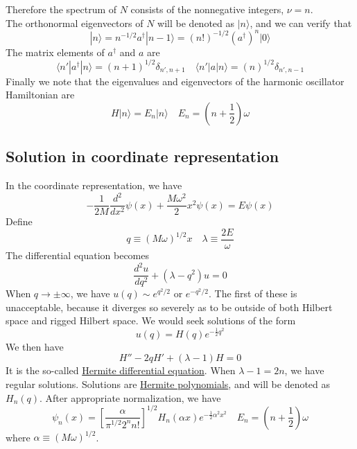 Therefore the spectrum of $N$ consists of the nonnegative integers, $\nu=n$. \\
The orthonormal eigenvectors of $N$ will be denoted as $|n\rangle$, and we can verify that
\[ |n\rangle = n^{-1/2} a^{\dagger} |n-1\rangle = (n!)^{-1/2} (a^{\dagger})^n |0\rangle\]
The matrix elements of $a^{\dagger}$ and $a$ are
\[\langle n' | a^{\dagger} |n \rangle = (n+1)^{1/2}\delta_{n',n+1} \quad  \langle n' | a |n \rangle = (n)^{1/2}\delta_{n',n-1}\]
Finally we note that the eigenvalues and eigenvectors of the harmonic oscillator Hamiltonian are
\[H |n\rangle = E_n |n\rangle \quad  E_n =(n+\frac{1}{2})\omega\]

\subsection{Solution in coordinate representation}
In the coordinate representation, we have
\[-\frac{1}{2M} \frac{d^2}{dx^2} \psi(x) + \frac{M\omega^2}{2}x^2 \psi(x) = E \psi(x)\]
Define
\[q \equiv (M\omega)^{1/2}x \quad \lambda \equiv \frac{2E}{\omega}\]
The differential equation becomes
\[\frac{d^2u}{dq^2} + (\lambda - q^2)u = 0\]
When $q \to \pm \infty$, we have $u(q) \sim e^{q^2/2}$ or $e^{-q^2/2}$. The first of these is unacceptable, because it
diverges so severely as to be outside of both Hilbert space and rigged Hilbert space. We would seek solutions of the form 
\[u(q) = H(q) e^{-\frac{1}{2}q^2}\]
We then have
\[H'' - 2qH' + (\lambda-1)H = 0\]
It is the so-called \href{http://mathworld.wolfram.com/HermiteDifferentialEquation.html}{Hermite differential equation}. When $\lambda - 1 = 2n$, we have regular solutions. Solutions are \href{http://mathworld.wolfram.com/HermitePolynomial.html}{Hermite polynomials}, and will be denoted as $H_n(q)$. After appropriate normalization, we have
\[\psi_n(x) = \left [ \frac{\alpha}{\pi^{1/2} 2^n n!} \right ]^{1/2} H_n(\alpha x) e^{-\frac{1}{2}\alpha^2 x^2} \quad E_n = (n+\frac{1}{2})\omega\]
where $\alpha \equiv (M\omega)^{1/2}$.

